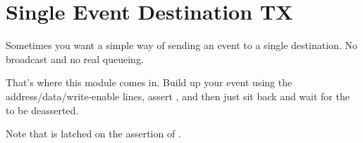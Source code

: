 \section{Single Event Destination TX}

Sometimes you want a simple way of sending an event to a single
destination. No broadcast and no real queueing. 

That's where this module comes in. Build up your event using the
address/data/write-enable lines, assert , and then just
sit back and wait for the  to be deasserted.

Note that  is latched on the assertion of
.



